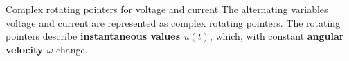 \begin{frame}
    
    \begin{Key point}{Complex rotating pointers for voltage and current}
        The alternating variables voltage and current are represented as complex rotating pointers. The rotating pointers describe 
            {\bf instantaneous values $u(t)$}, which, with constant {\bf angular velocity $\omega$} change. 
    \end{Key point}

\end{frame}


